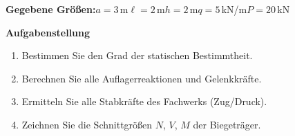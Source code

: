 \documentclass[a4paper,11pt]{article}
\begin{document}
\textbf{Gegebene Größen:}\quad $a=3$\,m\quad $\ell=2$\,m\quad $h=2$\,m\quad $q=5$\,kN/m\quad $P=20$\,kN
\par\medskip
\textbf{Aufgabenstellung}\par
\begin{enumerate}[label=\textbf{\arabic*.}]
  \item Bestimmen Sie den Grad der statischen Bestimmtheit.
  \item Berechnen Sie alle Auflagerreaktionen und Gelenkkräfte.
  \item Ermitteln Sie alle Stabkräfte des Fachwerks (Zug/Druck).
  \item Zeichnen Sie die Schnittgrößen $N$, $V$, $M$ der Biegeträger.
\end{enumerate}
\end{document}

